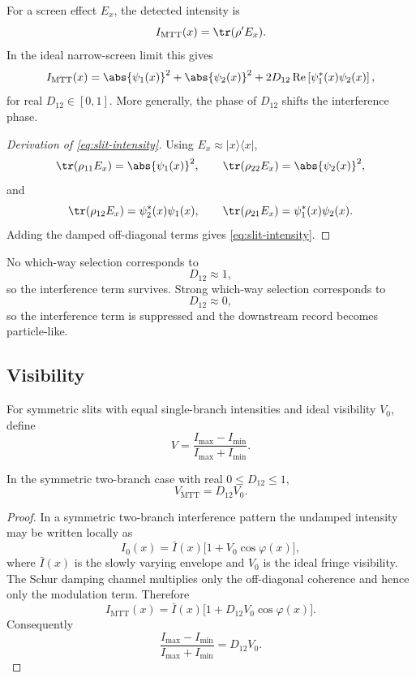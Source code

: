 \documentclass[11pt]{article}
\newcommand{\MTT}{\mathrm{MTT}}
\begin{document}
For a screen effect \(E_x\), the detected intensity is
\[
  I_{\MTT}(x)
  =
  \tr(\rho' E_x).
\]
In the ideal narrow-screen limit this gives
\begin{equation}
  I_{\MTT}(x)
  =
  \abs{\psi_1(x)}^2
  +
  \abs{\psi_2(x)}^2
  +
  2D_{12}\operatorname{Re}\left[\psi_1^\ast(x)\psi_2(x)\right],
  \label{eq:slit-intensity}
\end{equation}
for real \(D_{12}\in[0,1]\). More generally, the phase of \(D_{12}\) shifts the interference
phase.

\begin{proof}[Derivation of \cref{eq:slit-intensity}]
Using \(E_x\approx |x\rangle\langle x|\),
\[
  \tr(\rho_{11}E_x)=\abs{\psi_1(x)}^2,\qquad
  \tr(\rho_{22}E_x)=\abs{\psi_2(x)}^2,
\]
and
\[
  \tr(\rho_{12}E_x)=\psi_2^\ast(x)\psi_1(x),
  \qquad
  \tr(\rho_{21}E_x)=\psi_1^\ast(x)\psi_2(x).
\]
Adding the damped off-diagonal terms gives \cref{eq:slit-intensity}.
\end{proof}

No which-way selection corresponds to
\[
  D_{12}\approx1,
\]
so the interference term survives. Strong which-way selection corresponds to
\[
  D_{12}\approx0,
\]
so the interference term is suppressed and the downstream record becomes particle-like.

\subsection{Visibility}

For symmetric slits with equal single-branch intensities and ideal visibility \(V_0\), define
\[
  V=\frac{I_{\max}-I_{\min}}{I_{\max}+I_{\min}}.
\]

\begin{proposition}
\label{prop:visibility}
In the symmetric two-branch case with real \(0\le D_{12}\le1\),
\[
  V_{\MTT}=D_{12}V_0.
\]
\end{proposition}

\begin{proof}
In a symmetric two-branch interference pattern the undamped intensity may be written
locally as
\[
  I_0(x)=\bar I(x)\bigl[1+V_0\cos\varphi(x)\bigr],
\]
where \(\bar I(x)\) is the slowly varying envelope and \(V_0\) is the ideal fringe
visibility. The Schur damping channel multiplies only the off-diagonal coherence and hence
only the modulation term. Therefore
\[
  I_{\MTT}(x)=\bar I(x)\bigl[1+D_{12}V_0\cos\varphi(x)\bigr].
\]
Consequently
\[
  \frac{I_{\max}-I_{\min}}{I_{\max}+I_{\min}}=D_{12}V_0.
\]
\end{proof}
\end{document}
